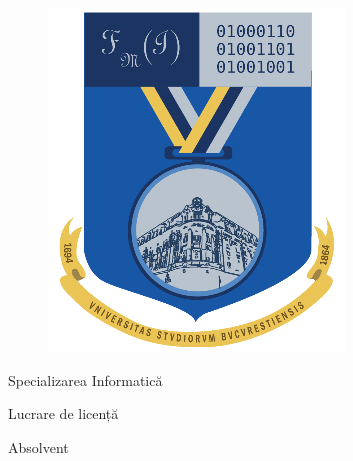 \documentclass[a4paper, 12pt]{report}
\begin{document}
\begin{titlepage}
\begin{figure}[!htb]
        \begin{minipage}{0.21\textwidth}
            \includegraphics[width=\linewidth]{img/FMI_Logo.png}
        \end{minipage}
    \end{figure}

    \begin{center}
        Specializarea Informatică
    \end{center}

    \vspace{0.5cm}

    \begin{center}
        {\Large Lucrare de licență}
    \end{center}

    \begin{center}
        {\huge \@title}
    \end{center}

    \vspace{2.8cm}

    \begin{center}
        \large Absolvent \\ \@author
    \end{center}


\end{titlepage}
\end{document}
